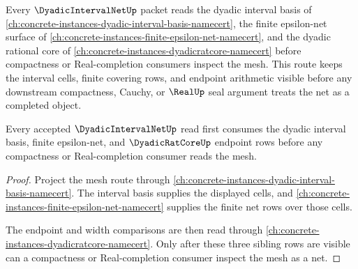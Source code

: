 Every $\DyadicIntervalNetUp$ packet reads the dyadic interval basis of \autoref{ch:concrete-instances-dyadic-interval-basis-namecert}, the finite epsilon-net surface of \autoref{ch:concrete-instances-finite-epsilon-net-namecert}, and the dyadic rational core of \autoref{ch:concrete-instances-dyadicratcore-namecert} before compactness or Real-completion consumers inspect the mesh. This route keeps the interval cells, finite covering rows, and endpoint arithmetic visible before any downstream compactness, Cauchy, or $\RealUp$ seal argument treats the net as a completed object.

\begin{theorem}
\label{thm:dyadic-interval-net-basis-route}
Every accepted $\DyadicIntervalNetUp$ read first consumes the dyadic interval basis, finite epsilon-net, and $\DyadicRatCoreUp$ endpoint rows before any compactness or Real-completion consumer reads the mesh.
\end{theorem}
\begin{proof}
Project the mesh route through \autoref{ch:concrete-instances-dyadic-interval-basis-namecert}. The interval basis supplies the displayed cells, and \autoref{ch:concrete-instances-finite-epsilon-net-namecert} supplies the finite net rows over those cells.

The endpoint and width comparisons are then read through \autoref{ch:concrete-instances-dyadicratcore-namecert}. Only after these three sibling rows are visible can a compactness or Real-completion consumer inspect the mesh as a net.
\end{proof}
